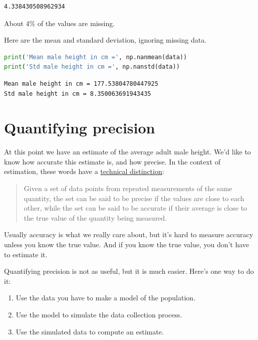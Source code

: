 \begin{lstlisting}[style=output]
4.338430508962934
\end{lstlisting}

About 4\% of the values are missing.

Here are the mean and standard deviation, ignoring missing data.

\begin{lstlisting}[language=Python,style=source]
print('Mean male height in cm =', np.nanmean(data))
print('Std male height in cm =', np.nanstd(data))
\end{lstlisting}

\begin{lstlisting}[style=output]
Mean male height in cm = 177.53804780447925
Std male height in cm = 8.350063691943435
\end{lstlisting}

\hypertarget{quantifying-precision}{%
\section{Quantifying precision}\label{quantifying-precision}}

At this point we have an estimate of the average adult male height. We'd
like to know how accurate this estimate is, and how precise. In the
context of estimation, these words have a
\href{https://en.wikipedia.org/wiki/Accuracy_and_precision}{technical
distinction}:

\begin{quote}
Given a set of data points from repeated measurements of the same
quantity, the set can be said to be precise if the values are close to
each other, while the set can be said to be accurate if their average is
close to the true value of the quantity being measured.
\end{quote}

Usually accuracy is what we really care about, but it's hard to measure
accuracy unless you know the true value. And if you know the true value,
you don't have to estimate it.

Quantifying precision is not as useful, but it is much easier. Here's
one way to do it:

\begin{enumerate}
\def\labelenumi{\arabic{enumi}.}
\item
  Use the data you have to make a model of the population.
\item
  Use the model to simulate the data collection process.
\item
  Use the simulated data to compute an estimate.
\end{enumerate}

